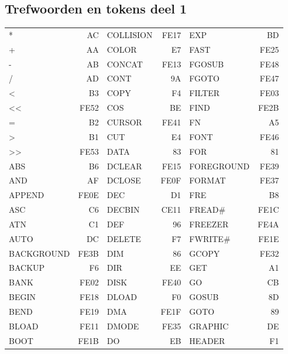 \subsection{Trefwoorden en tokens deel 1}
{\ttfamily
\setlength{\tabcolsep}{1mm}
\begin{center}
\begin{tabular}{|p{2.2cm}r|p{2.2cm}r|p{2.2cm}r|}
\hline
*          &   AC & COLLISION  & FE17 & EXP        &   BD \\
+          &   AA & COLOR      &   E7 & FAST       & FE25 \\
-          &   AB & CONCAT     & FE13 & FGOSUB     & FE48 \\
/          &   AD & CONT       &   9A & FGOTO      & FE47 \\
<          &   B3 & COPY       &   F4 & FILTER     & FE03 \\
<<         & FE52 & COS        &   BE & FIND       & FE2B \\
=          &   B2 & CURSOR     & FE41 & FN         &   A5 \\
>          &   B1 & CUT        &   E4 & FONT       & FE46 \\
>>         & FE53 & DATA       &   83 & FOR        &   81 \\
ABS        &   B6 & DCLEAR     & FE15 & FOREGROUND & FE39 \\
AND        &   AF & DCLOSE     & FE0F & FORMAT     & FE37 \\
APPEND     & FE0E & DEC        &   D1 & FRE        &   B8 \\
ASC        &   C6 & DECBIN     & CE11 & FREAD\#    & FE1C \\
ATN        &   C1 & DEF        &   96 & FREEZER    & FE4A \\
AUTO       &   DC & DELETE     &   F7 & FWRITE\#   & FE1E \\
BACKGROUND & FE3B & DIM        &   86 & GCOPY      & FE32 \\
BACKUP     &   F6 & DIR        &   EE & GET        &   A1 \\
BANK       & FE02 & DISK       & FE40 & GO         &   CB \\
BEGIN      & FE18 & DLOAD      &   F0 & GOSUB      &   8D \\
BEND       & FE19 & DMA        & FE1F & GOTO       &   89 \\
BLOAD      & FE11 & DMODE      & FE35 & GRAPHIC    &   DE \\
BOOT       & FE1B & DO         &   EB & HEADER     &   F1 \\

\end{tabular}
\end{center}}
